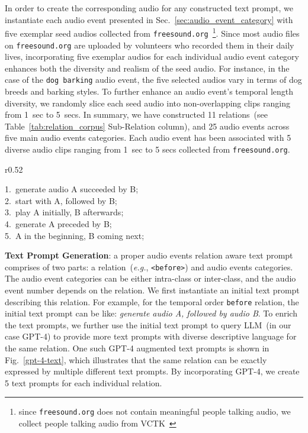In order to create the corresponding audio for any constructed text prompt, we instantiate each audio event presented in Sec.~\ref{sec:audio_event_category} with five exemplar seed audios collected from \texttt{freesound.org}~\footnote{since \texttt{freesound.org} does not contain meaningful people talking audio, we collect people talking audio from VCTK~\citep{yamagishi2019vctk}}. Since most audio files on \texttt{freesound.org} are uploaded by volunteers who recorded them in their daily lives, incorporating five exemplar audios for each individual audio event category enhances both the diversity and realism of the seed audio. For instance, in the case of the \texttt{dog barking} audio event, the five selected audios vary in terms of dog breeds and barking styles. To further enhance an audio event's temporal length diversity, we randomly slice each seed audio into non-overlapping clips ranging from 1~sec to 5~secs. In summary, we have constructed 11 relations~(see Table~\ref{tab:relation_corpus} Sub-Relation column), and 25 audio events across five main audio events categories. Each audio event has been associated with 5 diverse audio clips ranging from 1~sec to 5 secs collected from \texttt{freesound.org}.

\begin{wrapfigure}{r}{0.52\textwidth}
\begin{mdframed}[style=prompt]
\small
1.~generate audio A succeeded by B;\\
2.~start with A, followed by B;\\
3.~play A initially, B afterwards;\\
4.~generate A preceded by B;\\
5.~A in the beginning, B coming next;
\end{mdframed}
\vspace{-2mm}
\caption{\small GPT-4 augmented prompts~(\texttt{before} relation).}
\label{gpt-4-text}
\vspace{-3mm}
\end{wrapfigure}

\textbf{Text Prompt Generation}: a proper audio events relation aware text prompt comprises of two parts: a relation~(\textit{e.g.}, \texttt{<before>}) and audio events categories. The audio event categories can be either intra-class or inter-class, and the audio event number depends on the relation. We first instantiate an initial text prompt describing this relation. For example, for the temporal order \texttt{before} relation, the initial text prompt can be like: \textit{generate audio A, followed by audio B}. To enrich the text prompts, we further use the initial text prompt to query LLM~(in our case GPT-4) to provide more text prompts with diverse descriptive language for the same relation. 
One such GPT-4 augmented text prompts is shown in Fig.~\ref{gpt-4-text}, which illustrates that the same relation can be exactly expressed by multiple different text prompts. By incorporating GPT-4, we create 5 text prompts for each individual relation.

